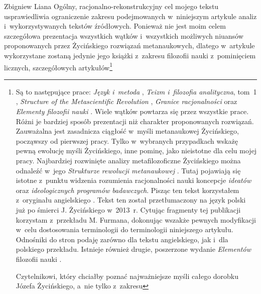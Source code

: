 \begin{artplenv}{Zbigniew Liana}
Ogólny, racjonalno-rekonstrukcyjny cel mojego tekstu usprawiedliwia ograniczenie zakresu podejmowanych w~niniejszym
artykule analiz i~wykorzystywanych tekstów źródłowych. Ponieważ nie jest moim celem szczegółowa prezentacja wszystkich
wątków i~wszystkich możliwych niuansów proponowanych przez Życińskiego rozwiązań metanaukowych, dlatego w~artykule
wykorzystane zostaną jedynie jego książki z~zakresu filozofii nauki z~pominięciem licznych, szczegółowych
artykułów\footnote{Są to następujące prace: \textit{Język i~metoda}
\parencite*{zycinski_jezyk_1983},
\textit{Teizm i~filozofia analityczna}, tom~1
\parencite*{zycinski_teizm_1985},
\textit{Structure of the Metascientific Revolution}
\parencite*{zycinski_structure_1988},
\textit{Granice racjonalności}
\parencite*{zycinski_granice_1993}
oraz \textit{Elementy filozofii nauki}
\parencite*{zycinski_elementy_1996}.
Wiele wątków powtarza się przez wszystkie prace. Różni je bardziej
sposób prezentacji niż charakter proponowanych rozwiązań. Zauważalna jest zasadnicza ciągłość w~myśli metanaukowej
Życińskiego, począwszy od pierwszej pracy. Tylko w~wybranych przypadkach wskażę pewną ewolucję myśli Życińskiego, inne
pominę, jako nieistotne dla celu mojej pracy. Najbardziej rozwinięte analizy metafilozoficzne Życińskiego można
odnaleźć w~jego \textit{Strukturze rewolucji metanaukowej}
\parencite*{zycinski_structure_1988,zycinski_struktura_2013}.
Tutaj pojawiają się
istotne z~punktu widzenia rozumienia racjonalności nauki koncepcje \textit{ideatów} oraz \textit{ideologicznych programów
badawczych}. Pisząc ten tekst korzystałem z~oryginału angielskiego
\parencite{zycinski_structure_1988}.
Tekst
ten został przetłumaczony na język polski już po śmierci J. Życińskiego w~2013~r. Cytując fragmenty tej publikacji
korzystam z~przekładu M. Furmana, dokonując wszakże pewnych modyfikacji w~celu dostosowania terminologii do terminologii
niniejszego artykułu. Odnośniki do stron podaję zarówno dla tekstu angielskiego, jak i~dla polskiego przekładu.
Istnieje również drugie, poszerzone wydanie \textit{Elementów} filozofii nauki
\parencite{zycinski_elementy_2015}. \par
Czytelnikowi, który chciałby poznać najważniejsze myśli całego dorobku Józefa Życińskiego, a~nie tylko z~zakresu
}
\end{artplenv}
